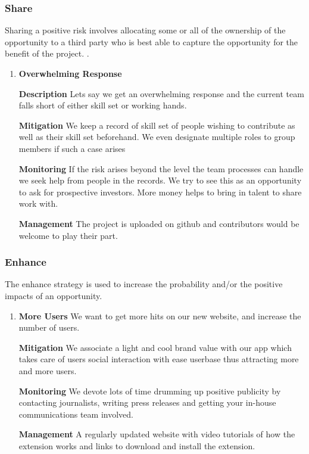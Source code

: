 \documentclass[12pt]{article}
\begin{document}
\subsubsection{Share}
Sharing a positive risk involves allocating some or all of the ownership of the opportunity to a third party who is best able to capture the opportunity for the benefit of the project.
.
\begin{enumerate}

\item
\textbf{Overwhelming Response}

\bigskip
    \textbf{Description}
Lets say we get an overwhelming response and the current team falls short of either skill set or  working hands. 

    \bigskip
    \textbf{Mitigation}
We keep a record of skill set of people wishing to contribute as well as their skill set beforehand. We even designate multiple roles to group members if such a case arises    
    
    \bigskip
    \textbf{Monitoring}
If the risk arises beyond the level the team processes can handle we seek help from people in the records. We try to see this as an opportunity to ask for prospective investors. More money helps to bring in talent to share work with.    
    
    \bigskip
    \textbf{Management}
The project is uploaded on github and contributors would be welcome to play their part.    
    

\end{enumerate}
\subsubsection{Enhance}
The enhance strategy is used to increase the probability and/or the positive impacts of an opportunity.
\begin{enumerate}
\item 
\textbf{More Users}
We want to get more hits on our new website, and increase the number of users.

    \bigskip
    \textbf{Mitigation}
We associate a light and cool brand value with our app which takes care of users social interaction with ease userbase thus attracting more and more users.
   
    \bigskip
    \textbf{Monitoring}
   We devote lots of time drumming up positive publicity by contacting journalists, writing press releases and getting your in-house communications team involved.
  
    \bigskip
    \textbf{Management}
A regularly updated website with video tutorials of how the extension works and links to download and install the extension.    

\end{enumerate}
\end{document}
